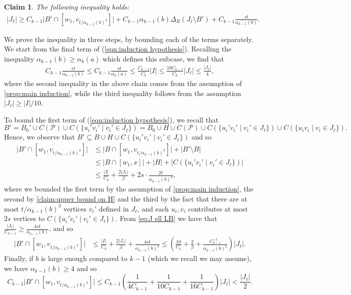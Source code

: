 \documentclass[a4paper,11pt]{article}
\makeatletter
\renewenvironment{proof}[1][\proofname] {\par\pushQED{\qed}\normalfont\topsep6\p@\@plus6\p@\relax\trivlist\item[\hskip\labelsep\bfseries#1\@addpunct{.}]\ignorespaces}{\popQED\endtrivlist\@endpefalse}
\newtheorem{claim}[theorem]{\bf Claim}
\theoremstyle{definition}
\def\cP{\mathcal{P}}
\makeatother
\begin{document}
\begin{proof}
\begin{claim}
The following inequality holds:
\begin{align}\label{eqn:induction hypothesis}
|J_\ell| \geq C_{k-1}\big| B'\cap [w_1,v_{t/\alpha_{k-1}(b)^3}] \big|+C_{k-1}\alpha_{k-1}(b)\Delta_R(J_\ell\setminus B')+C_{k-1} \frac{st}{\alpha_{k-1}(b)}.
\end{align}
\end{claim} 
\begin{proof}    
We prove the inequality in three steps, by bounding each of the terms separately. We start from the final term of (\ref{eqn:induction hypothesis}). Recalling the inequality $\alpha_{k-1}(b)\geq \alpha_k(a)$ which defines this subcase, we find that 
\begin{align}\label{eq:J ell LB}
C_{k-1} \frac{st}{\alpha_{k-1}(b)}\leq C_{k-1} \frac{st}{\alpha_{k}(a)}\leq \frac{C_{k-1}}{C_k} |I|\leq \frac{10 C_{k-1}}{C_{k}}|J_\ell|\leq \frac{|J_\ell|}{4},
\end{align}
where the second inequality in the above chain comes from the assumption of \cref{prop:main induction}, while the third inequality follows from the assumption $|J_\ell|\geq |I|/10$.

To bound the first term of (\ref{eqn:induction hypothesis}), we recall that
\[B'=B_0'\cup C(\cP)\cup C(\{u_{i}'v_i'\mid v_i'\in J_\ell\})= B_0\cup H\cup C(\cP)\cup C(\{u_{i}'v_i'\mid v_i'\in J_\ell\})\cup  C(\{u_iv_i\mid v_i\in J_\ell\}).\]
Hence, we observe that $B'\subseteq B\cup H \cup C(\{u_{i}'v_i'\mid v_i'\in J_\ell\})$ and so
\begin{align*}
\big|B'\cap [w_1,v_{t/\alpha_{k-1}(b)^3}]\big|&\leq \big|B\cap [w_1,v_{t/\alpha_{k-1}(b)^3}]\big|+|B'\setminus B|\\
&\leq \big|B \cap [w_1, x]\big|+|H|+\big|C(\{u_{i}'v_i'\mid v_i'\in J_\ell\})\big|\\
&\leq \frac{|I|}{C_k}+ \frac{2|J_\ell|}{\beta}+2s\cdot \frac{2t}{\alpha_{k-1}(b)^3},
\end{align*}
where we bounded the first term by the assumption of \cref{prop:main induction}, the second by \cref{claim:upper bound on H} and the third by the fact that there are at most $t/\alpha_{k-1}(b)^3$ vertices $v_i'$ defined in $J_\ell$, and each $u_i, v_i$ contributes at most $2s$ vertices to $C(\{u_{i}'v_i'\mid v_i'\in J_\ell\})$. 
From \eqref{eq:J ell LB} we have that $\frac{|J_{\ell}|}{C_{k-1}} \geq \frac{4st}{\alpha_{k-1}(b)}$, and so
\begin{align*}    
\big|B'\cap [w_1,v_{t/\alpha_{k-1}(b)^3}]\big|&\leq\frac{|I|}{C_k}+ \frac{2|J_\ell|}{\beta}+\frac{4st}{\alpha_{k-1}(b)^3}
\leq \left(\frac{10}{C_k}+\frac{2}{\beta}+\frac{C_{k-1}^{-1}}{\alpha_{k-1}(b)^2}\right)|J_\ell|.
\end{align*}
Finally, if $b$ is large enough compared to $k-1$ (which we recall we may assume), we have $\alpha_{k-1}(b)\geq 4$ and so 
\[C_{k-1}\big|B'\cap [w_1,v_{t/\alpha_{k-1}(b)^3}]\big|\leq C_{k-1} \left(\frac{1}{4C_{k-1}}+\frac{1}{10C_{k-1}}+\frac{1}{16C_{k-1}}\right)|J_\ell|< \frac{|J_{\ell}|}{2}.\]


\end{proof}
\end{proof}
\end{document}
